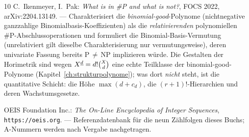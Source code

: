 \begin{thebibliography}{10}
 C.~Ikenmeyer, I.~Pak: \emph{What is in \#P
and what is not?}, FOCS 2022, arXiv:2204.13149.
--- Charakterisiert die \emph{binomial-good}-Polynome
(nichtnegative ganzzahlige Binomialbasis-Koeffizienten) als die
\emph{relativierenden} polynomiellen \#P-Abschlussoperationen und
formuliert die Binomial-Basis-Vermutung (unrelativiert gilt
dieselbe Charakterisierung nur vermutungsweise), deren univariate
Fassung bereits P$\,\ne\,$NP implizieren würde. Die Gestalten der Horimetrik sind wegen
$X^{\underline{d}}=d!\binom Xd$ eine echte Teilklasse der binomial-good-Polynome
(Kapitel~\ref{ch:strukturpolynome}); was dort \emph{nicht} steht,
ist die quantitative Schicht: die Höhe $\max(d+c_d)$, die
$(r{+}1)!$-Hierarchien und deren Wachstumsgesetze.

 OEIS Foundation Inc.: \emph{The On-Line Encyclopedia
of Integer Sequences}, \texttt{https://oeis.org}.
--- Referenzdatenbank für die neun Zählfolgen dieses Buchs;
A-Nummern werden nach Vergabe nachgetragen.

\end{thebibliography}
\endgroup
